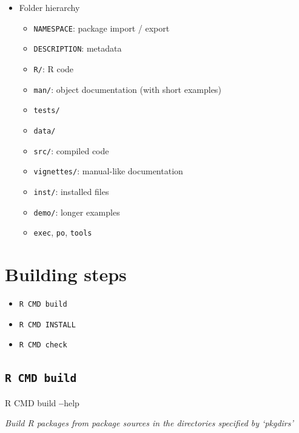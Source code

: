 \documentclass[]{book}
\newenvironment{Shaded}{\begin{snugshade}}{\end{snugshade}}
\newcommand{\OperatorTok}[1]{\textcolor[rgb]{0.81,0.36,0.00}{\textbf{#1}}}
\newcommand{\NormalTok}[1]{#1}
\providecommand{\tightlist}{%
  \setlength{\itemsep}{0pt}\setlength{\parskip}{0pt}}
\theoremstyle{definition}
\theoremstyle{definition}
\theoremstyle{definition}
\theoremstyle{remark}
\begin{document}
\begin{itemize}
\tightlist
\item
  Folder hierarchy

  \begin{itemize}
  \tightlist
  \item
    \texttt{NAMESPACE}: package import / export
  \item
    \texttt{DESCRIPTION}: metadata
  \item
    \texttt{R/}: R code
  \item
    \texttt{man/}: object documentation (with short examples)
  \item
    \texttt{tests/}
  \item
    \texttt{data/}
  \item
    \texttt{src/}: compiled code
  \item
    \texttt{vignettes/}: manual-like documentation
  \item
    \texttt{inst/}: installed files
  \item
    \texttt{demo/}: longer examples
  \item
    \texttt{exec}, \texttt{po}, \texttt{tools}
  \end{itemize}
\end{itemize}

\section{Building steps}\label{building-steps}

\begin{itemize}
\item
  \texttt{R\ CMD\ build}
\item
  \texttt{R\ CMD\ INSTALL}
\item
  \texttt{R\ CMD\ check}
\end{itemize}

\subsection{\texorpdfstring{\texttt{R\ CMD\ build}}{R CMD build}}\label{r-cmd-build}

\begin{Shaded}
\begin{Highlighting}[]
\NormalTok{R CMD build }\OperatorTok{--}\NormalTok{help}
\end{Highlighting}
\end{Shaded}

\emph{Build R packages from package sources in the directories specified
by `pkgdirs'}
\end{document}
